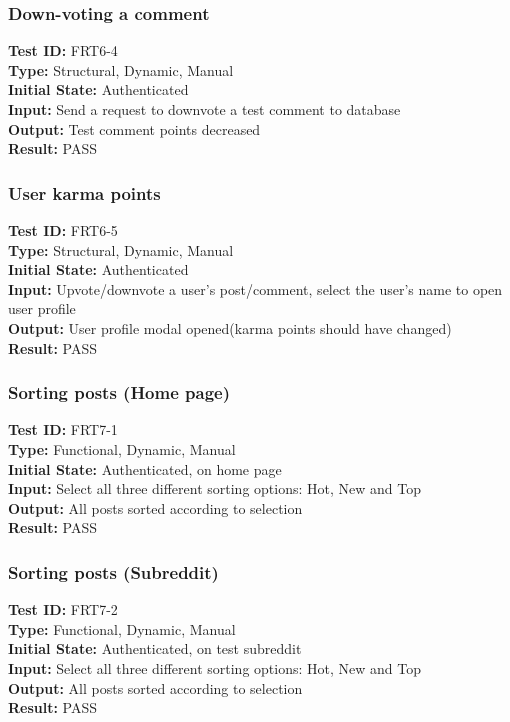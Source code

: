 \documentclass[12pt,fleqn]{article}
\begin{document}
\subsubsection{Down-voting a comment}
\textbf{Test ID:} FRT6-4\\
\textbf{Type:} Structural, Dynamic, Manual\\
\textbf{Initial State:} Authenticated\\
\textbf{Input:} Send a request to downvote a test comment to database\\
\textbf{Output:} Test comment points decreased\\
\textbf{Result:} PASS
\newpage
\subsubsection{User karma points}
\textbf{Test ID:} FRT6-5\\
\textbf{Type:} Structural, Dynamic, Manual\\
\textbf{Initial State:} Authenticated\\
\textbf{Input:} Upvote/downvote a user's post/comment, select the user's name to open user profile  \\
\textbf{Output:} User profile modal opened(karma points should have changed)\\
\textbf{Result:} PASS

\subsubsection{Sorting posts (Home page)}
\textbf{Test ID:} FRT7-1\\
\textbf{Type:} Functional, Dynamic, Manual\\
\textbf{Initial State:} Authenticated, on home page\\
\textbf{Input:} Select all three different sorting options: Hot, New and Top \\
\textbf{Output:} All posts sorted according to selection\\
\textbf{Result:} PASS

\subsubsection{Sorting posts (Subreddit)}
\textbf{Test ID:} FRT7-2\\
\textbf{Type:} Functional, Dynamic, Manual\\
\textbf{Initial State:} Authenticated, on test subreddit\\
\textbf{Input:} Select all three different sorting options: Hot, New and Top \\
\textbf{Output:} All posts sorted according to selection\\
\textbf{Result:} PASS
\end{document}
